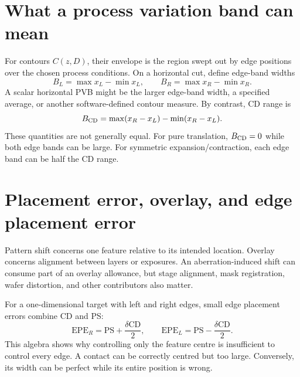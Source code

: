 \section{What a process variation band can mean}
For contours $C(z,D)$, their envelope is the region swept out by edge
positions over the chosen process conditions.
On a horizontal cut, define edge-band widths
\begin{equation}
B_L=\max x_L-\min x_L,\qquad
B_R=\max x_R-\min x_R.
\label{eq:pvbedges}
\end{equation}
A scalar horizontal PVB might be the larger edge-band width, a
specified average, or another software-defined contour measure.
By contrast, CD range is
\begin{equation}
B_{\rm CD}=\max(x_R-x_L)-\min(x_R-x_L).
\label{eq:cdspan}
\end{equation}
These quantities are not generally equal. For pure translation,
$B_{\rm CD}=0$ while both edge bands can be large.
For symmetric expansion/contraction, each edge band can be half
the CD range.


\section{Placement error, overlay, and edge placement error}
Pattern shift concerns one feature relative to its intended location.
Overlay concerns alignment between layers or exposures.
An aberration-induced shift can consume part of an overlay allowance,
but stage alignment, mask registration, wafer distortion, and other
contributors also matter.

For a one-dimensional target with left and right edges, small
edge placement errors combine CD and PS:
\begin{equation}
\mathrm{EPE}_R=\mathrm{PS}+\frac{\delta\mathrm{CD}}2,\qquad
\mathrm{EPE}_L=\mathrm{PS}-\frac{\delta\mathrm{CD}}2.
\label{eq:epe}
\end{equation}
This algebra shows why controlling only the feature centre is insufficient
to control every edge. A contact can be correctly centred but too large.
Conversely, its width can be perfect while its entire position is wrong.

